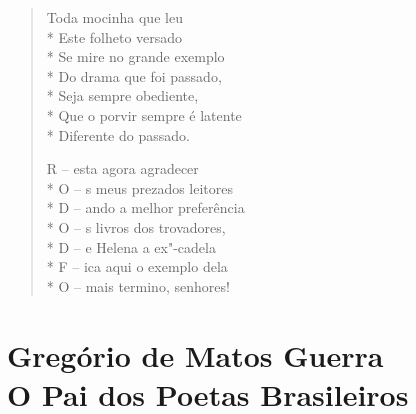 \begin{verse}
Toda mocinha que leu\\*
Este folheto versado\\*
Se mire no grande exemplo\\*
Do drama que foi passado,\\*
Seja sempre obediente,\\*
Que o porvir sempre é latente\\*
Diferente do passado.

R -- esta agora agradecer\\*
O -- s meus prezados leitores\\*
D -- ando a melhor preferência\\*
O -- s livros dos trovadores,\\*
D -- e Helena a ex"-cadela\\*
F -- ica aqui o exemplo dela\\*
O -- mais termino, senhores!
\end{verse}

\chapter[Gregório de Matos Guerra -- O Pai\\ dos Poetas Brasileiros]{Gregório de Matos Guerra\\ O Pai dos Poetas Brasileiros}

